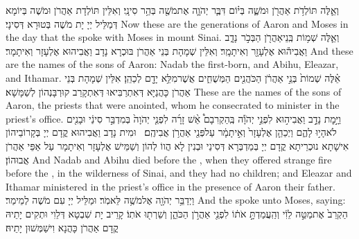 \newperek
{}%
{וְאֵ֛לֶּה תּוֹלְדֹ֥ת אַהֲרֹ֖ן וּמֹשֶׁ֑ה בְּי֗וֹם דִּבֶּ֧ר יְהֹוָ֛ה אֶת\maqqaf מֹשֶׁ֖ה בְּהַ֥ר סִינָֽי׃}
{וְאִלֵּין תּוֹלְדָת אַהֲרֹן וּמֹשֶׁה בְּיוֹמָא דְּמַלֵּיל יְיָ יָת מֹשֶׁה בְּטוּרָא דְּסִינָי׃}
{Now these are the generations of Aaron and Moses in the day that the \lord\space spoke with Moses in mount Sinai.}{}
{וְאֵ֛לֶּה שְׁמ֥וֹת בְּֽנֵי\maqqaf אַהֲרֹ֖ן הַבְּכֹ֣ר \pasek  נָדָ֑ב וַאֲבִיה֕וּא אֶלְעָזָ֖ר וְאִיתָמָֽר׃}
{וְאִלֵּין שְׁמָהָת בְּנֵי אַהֲרֹן בּוּכְרָא נָדָב וַאֲבִיהוּא אֶלְעָזָר וְאִיתָמָר׃}
{And these are the names of the sons of Aaron: Nadab the first-born, and Abihu, Eleazar, and Ithamar.}{}
{אֵ֗לֶּה שְׁמוֹת֙ בְּנֵ֣י אַהֲרֹ֔ן הַכֹּהֲנִ֖ים הַמְּשֻׁחִ֑ים אֲשֶׁר\maqqaf מִלֵּ֥א יָדָ֖ם לְכַהֵֽן׃}
{אִלֵּין שְׁמָהָת בְּנֵי אַהֲרֹן כָּהֲנַיָּא דְּאִתְרַבִּיאוּ דְּאִתְקָרַב קוּרְבָּנְהוֹן לְשַׁמָּשָׁא׃}
{These are the names of the sons of Aaron, the priests that were anointed, whom he consecrated to minister in the priest’s office.}{}
{וַיָּ֣מׇת נָדָ֣ב וַאֲבִיה֣וּא לִפְנֵ֣י יְהֹוָ֡ה בְּֽהַקְרִבָם֩ אֵ֨שׁ זָרָ֜ה לִפְנֵ֤י יְהֹוָה֙ בְּמִדְבַּ֣ר סִינַ֔י וּבָנִ֖ים לֹא\maqqaf הָי֣וּ לָהֶ֑ם וַיְכַהֵ֤ן אֶלְעָזָר֙ וְאִ֣יתָמָ֔ר עַל\maqqaf פְּנֵ֖י אַהֲרֹ֥ן אֲבִיהֶֽם׃ \petucha }
{וּמִית נָדָב וַאֲבִיהוּא קֳדָם יְיָ בְּקָרוֹבֵיהוֹן אִישָׁתָא נוּכְרֵיתָא קֳדָם יְיָ בְּמַדְבְּרָא דְּסִינַי וּבְנִין לָא הֲווֹ לְהוֹן וְשַׁמֵּישׁ אֶלְעָזָר וְאִיתָמָר עַל אַפֵּי אַהֲרֹן אֲבוּהוֹן׃}
{And Nadab and Abihu died before the \lord, when they offered strange fire before the \lord, in the wilderness of Sinai, and they had no children; and Eleazar and Ithamar ministered in the priest’s office in the presence of Aaron their father.}{}
{וַיְדַבֵּ֥ר יְהֹוָ֖ה אֶל\maqqaf מֹשֶׁ֥ה לֵּאמֹֽר׃}
{וּמַלֵּיל יְיָ עִם מֹשֶׁה לְמֵימַר׃}
{And the \lord\space spoke unto Moses, saying:}{}
{הַקְרֵב֙ אֶת\maqqaf מַטֵּ֣ה לֵוִ֔י וְהַֽעֲמַדְתָּ֣ אֹת֔וֹ לִפְנֵ֖י אַהֲרֹ֣ן הַכֹּהֵ֑ן וְשֵׁרְת֖וּ אֹתֽוֹ׃}
{קָרֵיב יָת שִׁבְטָא דְּלֵוִי וּתְקִים יָתֵיהּ קֳדָם אַהֲרֹן כָּהֲנָא וִישַׁמְּשׁוּן יָתֵיהּ׃}
